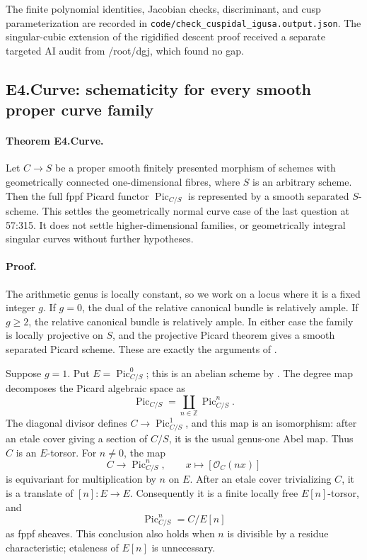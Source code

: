 The finite polynomial identities, Jacobian checks, discriminant,
and cusp parameterization are recorded in
\texttt{code/check\_cuspidal\_igusa.output.json}.
The singular-cubic extension of the rigidified descent proof received
a separate targeted AI audit from /root/dgj, which found no gap.

\subsection*{E4.Curve: schematicity for every smooth proper curve family}

\paragraph{Theorem E4.Curve.}
Let $C\to S$ be a proper smooth finitely presented morphism of schemes
with geometrically connected one-dimensional fibres, where $S$ is an
arbitrary scheme. Then the full fppf Picard functor $\operatorname{Pic}_{C/S}$
is represented by a smooth separated $S$-scheme. This settles the
geometrically normal curve case of the last question at 57:315. It does
not settle higher-dimensional families, or geometrically integral
singular curves without further hypotheses.

\paragraph{Proof.}
The arithmetic genus is locally constant, so we work on a locus where
it is a fixed integer $g$. If $g=0$, the dual of the relative canonical
bundle is relatively ample. If $g\geq2$, the relative canonical bundle
is relatively ample. In either case the family is locally projective
on $S$, and the projective Picard theorem gives a smooth separated
Picard scheme. These are exactly the arguments of
\cite[\S9.3, Theorem~1 and Remark~2, p.~252]{BCEBLR1990}.

Suppose $g=1$. Put $E=\operatorname{Pic}^0_{C/S}$; this is an abelian
scheme by \cite[\S9.4, Proposition~4, p.~260]{BCEBLR1990}.
The degree map decomposes the Picard algebraic space as
\[
 \operatorname{Pic}_{C/S}=\coprod_{n\in\mathbb Z}\operatorname{Pic}^n_{C/S}.
\]
The diagonal divisor defines $C\to\operatorname{Pic}^1_{C/S}$, and
this map is an isomorphism: after an etale cover giving a section of
$C/S$, it is the usual genus-one Abel map. Thus $C$ is an $E$-torsor.
For $n\neq0$, the map
\[
 C\longrightarrow\operatorname{Pic}^n_{C/S},\qquad
        x\longmapsto[\mathcal O_C(nx)]                  \tag{E4.Curve.1}
\]
is equivariant for multiplication by $n$ on $E$. After an etale
cover trivializing $C$, it is a translate of $[n]:E\to E$.
Consequently it is a finite locally free $E[n]$-torsor, and
\[
        \operatorname{Pic}^n_{C/S}=C/E[n]               \tag{E4.Curve.2}
\]
as fppf sheaves. This conclusion also holds when $n$ is divisible by
a residue characteristic; etaleness of $E[n]$ is unnecessary.

